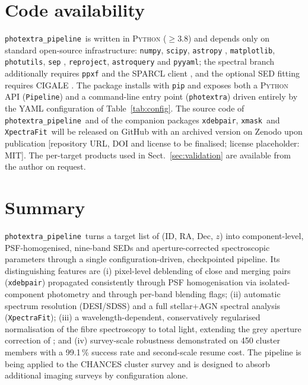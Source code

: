 \documentclass{aa}
\newcommand{\photextra}{\texttt{photextra\_pipeline}}
\newcommand{\xdebpair}{\texttt{xdebpair}}
\newcommand{\xmask}{\texttt{xmask}}
\newcommand{\xpectrafit}{\texttt{XpectraFit}}
\begin{document}
\section{Code availability}
\label{sec:availability}

\photextra\ is written in \textsc{Python} ($\geq$3.8) and depends only on
standard open-source infrastructure: \texttt{numpy}, \texttt{scipy},
\texttt{astropy} \citep{astropy2022}, \texttt{matplotlib},
\texttt{photutils}, \texttt{sep} \citep{barbary2016},
\texttt{reproject}, \texttt{astroquery} \citep{ginsburg2019} and
\texttt{pyyaml}; the spectral branch additionally requires
\texttt{ppxf} \citep{cappellari2017} and the SPARCL client
\citep{juneau2024}, and the optional SED fitting requires CIGALE
\citep{boquien2019}. The package installs with \texttt{pip} and exposes
both a \textsc{Python} API (\texttt{Pipeline}) and a command-line entry
point (\texttt{photextra}) driven entirely by the YAML configuration of
Table~\ref{tab:config}. The source code of \photextra\ and of the
companion packages \xdebpair, \xmask\ and \xpectrafit\ will be released
on GitHub with an archived version on Zenodo upon publication [repository
URL, DOI and license to be finalised; license placeholder: MIT]. The
per-target products used in Sect.~\ref{sec:validation} are available from
the author on request.

\section{Summary}
\label{sec:summary}

\photextra\ turns a target list of (ID, RA, Dec, $z$) into
component-level, PSF-homogenised, nine-band SEDs and aperture-corrected
spectroscopic parameters through a single configuration-driven,
checkpointed pipeline. Its distinguishing features are (i) pixel-level
deblending of close and merging pairs (\xdebpair) propagated consistently
through PSF homogenisation via isolated-component photometry and through
per-band blending flags; (ii) automatic spectrum resolution (DESI/SDSS)
and a full stellar+AGN spectral analysis (\xpectrafit); (iii) a
wavelength-dependent, conservatively regularised normalisation of the
fibre spectroscopy to total light, extending the grey aperture correction
of \citet{zou2024}; and (iv) survey-scale robustness demonstrated on 450
cluster members with a 99.1\,\% success rate and second-scale resume
cost. The pipeline is being applied to the CHANCES cluster survey and is
designed to absorb additional imaging surveys by configuration alone.
\end{document}
